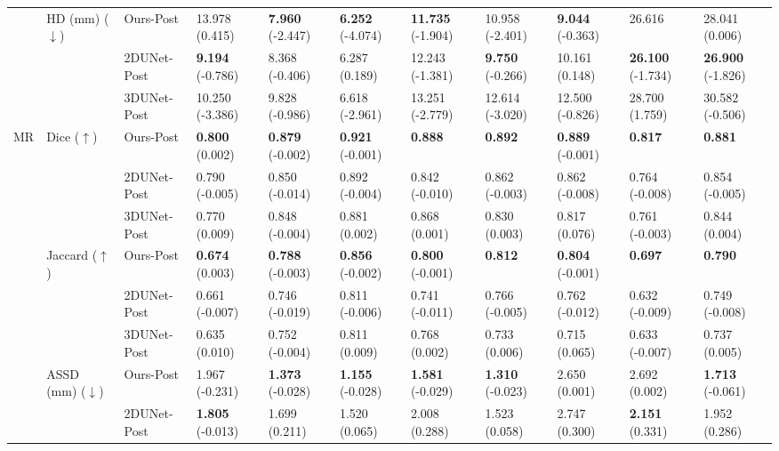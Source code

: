 \documentclass[times,review,preprint,authoryear]{elsarticle}
\begin{document}
\begin{table}
{{\begin{tabular}{lllllllllll}
\cline{2-11}
   & \multirow{3}{*}{HD (mm) ($\downarrow$)} & Ours-Post &  13.978 (0.415) &   \textbf{7.960} (-2.447) &   \textbf{6.252} (-4.074) &  \textbf{11.735} (-1.904) &  10.958 (-2.401) &   \textbf{9.044} (-0.363) &  26.616 &  28.041 (0.006) \\
   &         & 2DUNet-Post &   \textbf{9.194} (-0.786) &   8.368 (-0.406) &   6.287 (0.189) &  12.243 (-1.381) &   \textbf{9.750} (-0.266) &  10.161 (0.148) &  \textbf{26.100} (-1.734) &  \textbf{26.900} (-1.826) \\
   &         & 3DUNet-Post &  10.250 (-3.386) &   9.828 (-0.986) &   6.618 (-2.961) &  13.251 (-2.779) &  12.614 (-3.020) &  12.500 (-0.826) &  28.700 (1.759) &  30.582 (-0.506) \\
\cline{1-11}
\cline{2-11}
\multirow{12}{*}{MR} & \multirow{3}{*}{Dice ($\uparrow$)} & Ours-Post &   \textbf{0.800} (0.002) &   \textbf{0.879} (-0.002) &   \textbf{0.921} (-0.001) &   \textbf{0.888} &   \textbf{0.892} &   \textbf{0.889} (-0.001) &   \textbf{0.817} &   \textbf{0.881} \\
   &         & 2DUNet-Post &   0.790 (-0.005) &   0.850 (-0.014) &   0.892 (-0.004) &   0.842 (-0.010) &   0.862 (-0.003) &   0.862 (-0.008) &   0.764 (-0.008) &   0.854 (-0.005) \\
   &         & 3DUNet-Post &   0.770 (0.009) &   0.848 (-0.004) &   0.881 (0.002) &   0.868 (0.001) &   0.830 (0.003) &   0.817 (0.076) &   0.761 (-0.003) &   0.844 (0.004)\\
\cline{2-11}
   & \multirow{3}{*}{Jaccard ($\uparrow$)} & Ours-Post &   \textbf{0.674} (0.003) &   \textbf{0.788} (-0.003) &   \textbf{0.856} (-0.002) &  \textbf{ 0.800} (-0.001) &   \textbf{0.812} &   \textbf{0.804} (-0.001) &   \textbf{0.697} &   \textbf{0.790} \\
   &         & 2DUNet-Post &   0.661 (-0.007) &   0.746 (-0.019) &   0.811 (-0.006) &   0.741 (-0.011) &   0.766 (-0.005) &   0.762 (-0.012) &   0.632 (-0.009) &   0.749 (-0.008) \\
   &         & 3DUNet-Post &   0.635 (0.010) &   0.752 (-0.004) &   0.811 (0.009) &   0.768 (0.002) &   0.733 (0.006) &   0.715 (0.065) &   0.633 (-0.007) &   0.737 (0.005) \\
\cline{2-11}
   & \multirow{3}{*}{ASSD (mm) ($\downarrow$)} & Ours-Post &   1.967 (-0.231) &   \textbf{1.373} (-0.028) &   \textbf{1.155} (-0.028) &   \textbf{1.581} (-0.029) &   \textbf{1.310} (-0.023) &   2.650 (0.001) &   2.692 (0.002) &   \textbf{1.713} (-0.061) \\
   &         & 2DUNet-Post &   \textbf{1.805} (-0.013) &   1.699 (0.211) &   1.520 (0.065) &   2.008 (0.288) &   1.523 (0.058) &   2.747 (0.300) &   \textbf{2.151} (0.331) &   1.952 (0.286) \\

\end{tabular}}}
\end{table}
\end{document}
